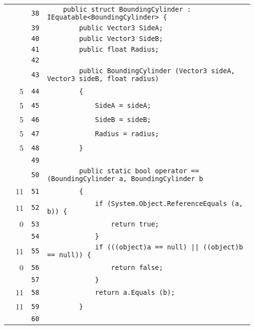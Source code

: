 \documentclass[a4paper,10pt]{article}
\begin{document}
\begin{longtable}[l]{lrrl}
\cellcolor{gray} &  & \verb~38~ & \verb~    public struct BoundingCylinder : IEquatable<BoundingCylinder> {~\\
\cellcolor{gray} &  & \verb~39~ & \verb~        public Vector3 SideA;~\\
\cellcolor{gray} &  & \verb~40~ & \verb~        public Vector3 SideB;~\\
\cellcolor{gray} &  & \verb~41~ & \verb~        public float Radius;~\\
\cellcolor{gray} &  & \verb~42~ & \verb~~\\
\cellcolor{gray} &  & \verb~43~ & \verb~        public BoundingCylinder (Vector3 sideA, Vector3 sideB, float radius)~\\
\cellcolor{green} & 5 & \verb~44~ & \verb~        {~\\
\cellcolor{green} & 5 & \verb~45~ & \verb~            SideA = sideA;~\\
\cellcolor{green} & 5 & \verb~46~ & \verb~            SideB = sideB;~\\
\cellcolor{green} & 5 & \verb~47~ & \verb~            Radius = radius;~\\
\cellcolor{green} & 5 & \verb~48~ & \verb~        }~\\
\cellcolor{gray} &  & \verb~49~ & \verb~~\\
\cellcolor{gray} &  & \verb~50~ & \verb~        public static bool operator == (BoundingCylinder a, BoundingCylinder b~\\
\cellcolor{green} & 11 & \verb~51~ & \verb~        {~\\
\cellcolor{green} & 11 & \verb~52~ & \verb~            if (System.Object.ReferenceEquals (a, b)) {~\\
\cellcolor{red} & 0 & \verb~53~ & \verb~                return true;~\\
\cellcolor{gray} &  & \verb~54~ & \verb~            }~\\
\cellcolor{green} & 11 & \verb~55~ & \verb~            if (((object)a == null) || ((object)b == null)) {~\\
\cellcolor{red} & 0 & \verb~56~ & \verb~                return false;~\\
\cellcolor{gray} &  & \verb~57~ & \verb~            }~\\
\cellcolor{green} & 11 & \verb~58~ & \verb~            return a.Equals (b);~\\
\cellcolor{green} & 11 & \verb~59~ & \verb~        }~\\
\cellcolor{gray} &  & \verb~60~ & \verb~~\\

\end{longtable}
\end{document}
